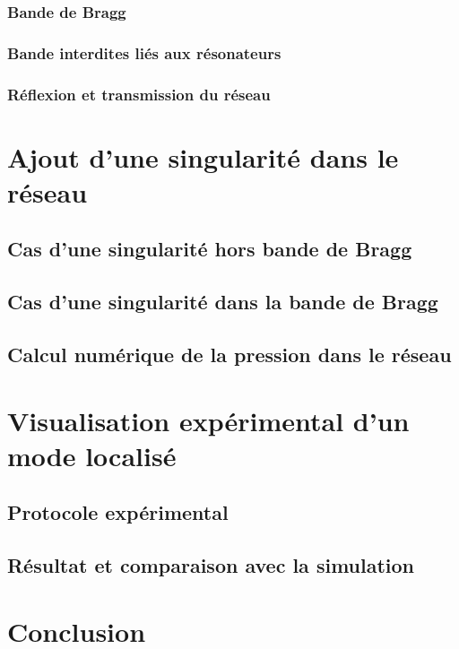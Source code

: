 \documentclass[a4paper]{report}
\begin{document}
\subsection{Bande de Bragg}
\subsection{Bande interdites liés aux résonateurs}
\subsection{Réflexion et transmission du réseau}



\chapter{Ajout d'une singularité dans le réseau}
\section{Cas d'une singularité hors bande de Bragg}
\section{Cas d'une singularité dans la bande de Bragg}
\section{Calcul numérique de la pression dans le réseau}

\chapter{Visualisation expérimental d'un mode localisé}
\section{Protocole expérimental}
\section{Résultat et comparaison avec la simulation}

\chapter{Conclusion}
\end{document}
